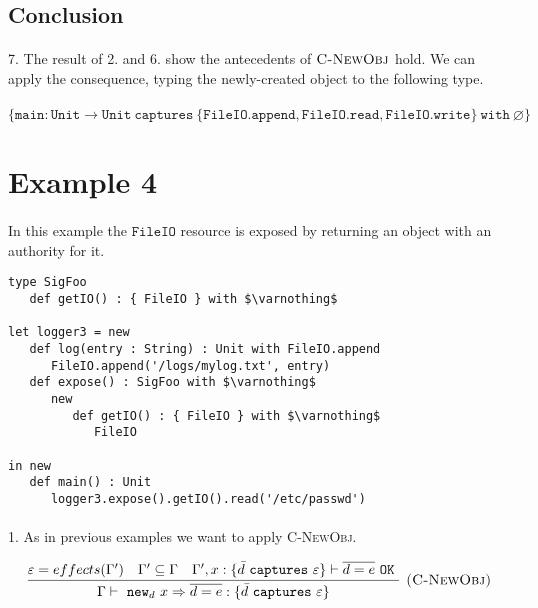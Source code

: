\documentclass{llncs}
\newcommand{\keywadj}[1]{\mathtt{#1}}
\newcommand{\keyw}[1]{\keywadj{#1}~}
\begin{document}
\subsection*{Conclusion}

\paragraph{}
7. The result of 2. and 6. show the antecedents of $\textsc{C-NewObj}$ hold. We can apply the consequence, typing the newly-created object to the following type.
\paragraph{}
 $\keywadj{ \{ main : Unit \rightarrow Unit~captures~\{FileIO.append, FileIO.read, FileIO.write\} ~with~\varnothing \}}$

\section{Example 4}

\paragraph{}
In this example the $\keywadj{FileIO}$ resource is exposed by returning an object with an authority for it.\\

\vspace{-6pt}
\begin{lstlisting}[xleftmargin=20pt]
type SigFoo
   def getIO() : { FileIO } with $\varnothing$

let logger3 = new
   def log(entry : String) : Unit with FileIO.append
      FileIO.append('/logs/mylog.txt', entry)
   def expose() : SigFoo with $\varnothing$
      new
         def getIO() : { FileIO } with $\varnothing$
            FileIO

in new
   def main() : Unit
      logger3.expose().getIO().read('/etc/passwd')
\end{lstlisting}

\paragraph{}
1. As in previous examples we want to apply \textsc{C-NewObj}.

\[
\begin{array}{c}
\infer[\textsc{(C-NewObj)}]
	{\Gamma \vdash~\keywadj{new}_d~x \Rightarrow \overline{d = e} : \{  \bar d~\keyw{captures} \varepsilon \} }
	{\varepsilon = effects(\Gamma') & \Gamma' \subseteq \Gamma & \Gamma', x : \{ \bar d~\keyw {captures} \varepsilon \} \vdash \overline{d = e}~\keyw{OK}} \\
\end{array}
\]
\end{document}
